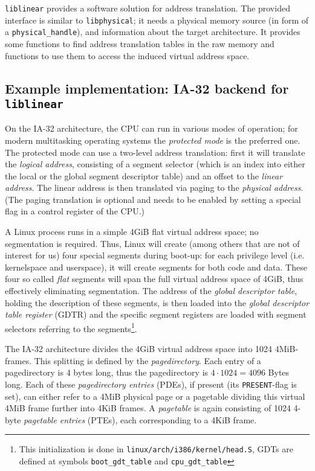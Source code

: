 \texttt{liblinear} provides a software solution for address translation. The
provided interface is similar to \texttt{libphysical}; it needs a physical
memory source (in form of a \texttt{physical\_handle}), and information about
the target architecture. It provides some functions to find address translation
tables in the raw memory and functions to use them to access the induced virtual
address space.



\subsection{Example implementation: IA-32 backend for \texttt{liblinear}}

On the IA-32 architecture, the CPU can run in various modes of operation; for
modern multitasking operating systems the \emph{protected mode} is the preferred
one.  The protected mode can use a two-level address translation: first it will
translate the \emph {logical address}, consisting of a segment selector (which
is an index into either the local or the global segment descriptor table) and an
offset to the \emph{linear address}.  The linear address is then translated via
paging to the \emph{physical address}. (The paging translation is optional and
needs to be enabled by setting a special flag in a control register of the CPU.)

\label{linux_gdt} A Linux process runs in a simple 4GiB flat virtual address
space; no segmentation is required. Thus, Linux will create (among others that
are not of interest for us) four special segments during boot-up: for each
privilege level (i.e. kernelspace and userspace), it will create segments for
both code and data. These four so called \emph{flat} segments will span the full
virtual address space of 4GiB, thus effectively eliminating segmentation. The
address of the \emph{global descriptor table}, holding the description of these
segments, is then loaded into the \emph{global descriptor table register} (GDTR)
and the specific segment registers are loaded with segment selectors referring
to the segments\footnote{This initialization is done in
\texttt{linux/arch/i386/kernel/head.S}, GDTs are defined at symbols
\texttt{boot\_gdt\_table} and \texttt{cpu\_gdt\_table}}.

The IA-32 architecture divides the 4GiB virtual address space into 1024
4MiB-frames. This splitting is defined by the \emph{pagedirectory}. Each entry
of a pagedirectory is 4 bytes long, thus the pagedirectory is $4 \cdot 1024 =
4096$ Bytes long. Each of these \emph{pagedirectory entries} (PDEs), if present
(its \texttt{PRESENT}-flag is set), can either refer to a 4MiB physical page or
a pagetable dividing this virtual 4MiB frame further into 4KiB frames. A
\emph{pagetable} is again consisting of 1024 4-byte \emph{pagetable entries}
(PTEs), each corresponding to a 4KiB frame.

